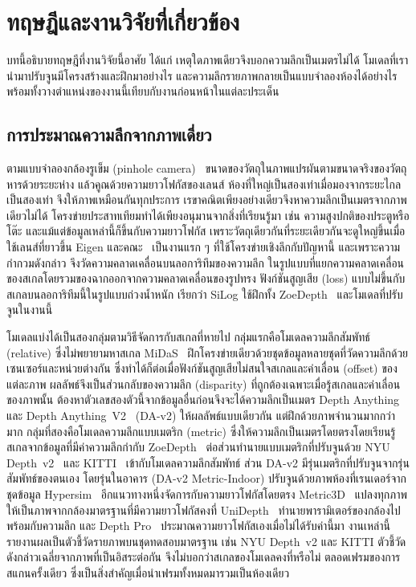 \section{ทฤษฎีและงานวิจัยที่เกี่ยวข้อง}\label{sec:related}

บทนี้อธิบายทฤษฎีที่งานวิจัยนี้อาศัย ได้แก่ เหตุใดภาพเดียวจึงบอกความลึกเป็นเมตรไม่ได้
โมเดลที่เรานำมาปรับจูนมีโครงสร้างและฝึกมาอย่างไร และความลึกรายภาพกลายเป็นแบบจำลองห้องได้อย่างไร
พร้อมทั้งวางตำแหน่งของงานนี้เทียบกับงานก่อนหน้าในแต่ละประเด็น

\subsection{การประมาณความลึกจากภาพเดี่ยว}
ตามแบบจำลองกล้องรูเข็ม (pinhole camera)~\cite{hartley} ขนาดของวัตถุในภาพแปรผันตามขนาดจริงของวัตถุ
หารด้วยระยะห่าง แล้วคูณด้วยความยาวโฟกัสของเลนส์ ห้องที่ใหญ่เป็นสองเท่าเมื่อมองจากระยะไกลเป็นสองเท่า
จึงให้ภาพเหมือนกันทุกประการ เรขาคณิตเพียงอย่างเดียวจึงหาความลึกเป็นเมตรจากภาพเดียวไม่ได้
โครงข่ายประสาทเทียมทำได้เพียงอนุมานจากสิ่งที่เรียนรู้มา เช่น ความสูงปกติของประตูหรือโต๊ะ
และแม้แต่ข้อมูลเหล่านี้ก็ขึ้นกับความยาวโฟกัส เพราะวัตถุเดียวกันที่ระยะเดียวกันจะดูใหญ่ขึ้นเมื่อใช้เลนส์ที่ยาวขึ้น
Eigen และคณะ~\cite{eigen14} เป็นงานแรก ๆ ที่ใช้โครงข่ายเชิงลึกกับปัญหานี้
และเพราะความกำกวมดังกล่าว จึงวัดความคลาดเคลื่อนบนลอการิทึมของความลึก
ในรูปแบบที่แยกความคลาดเคลื่อนของสเกลโดยรวมของฉากออกจากความคลาดเคลื่อนของรูปทรง
ฟังก์ชันสูญเสีย (loss) แบบไม่ขึ้นกับสเกลบนลอการิทึมนี้ในรูปแบบถ่วงน้ำหนัก เรียกว่า SiLog
ใช้ฝึกทั้ง ZoeDepth~\cite{zoedepth} และโมเดลที่ปรับจูนในงานนี้

โมเดลแบ่งได้เป็นสองกลุ่มตามวิธีจัดการกับสเกลที่หายไป กลุ่มแรกคือโมเดลความลึกสัมพัทธ์ (relative) ซึ่งไม่พยายามหาสเกล
MiDaS~\cite{midas} ฝึกโครงข่ายเดียวด้วยชุดข้อมูลหลายชุดที่วัดความลึกด้วยเซนเซอร์และหน่วยต่างกัน
ซึ่งทำได้ก็ต่อเมื่อฟังก์ชันสูญเสียไม่สนใจสเกลและค่าเลื่อน (offset) ของแต่ละภาพ
ผลลัพธ์จึงเป็นส่วนกลับของความลึก (disparity) ที่ถูกต้องเฉพาะเมื่อรู้สเกลและค่าเลื่อนของภาพนั้น
ต้องหาตัวเลขสองตัวนี้จากข้อมูลอื่นก่อนจึงจะได้ความลึกเป็นเมตร Depth Anything~\cite{da1}
และ Depth Anything~V2~\cite{da2} (\mbox{DA-v2}) ให้ผลลัพธ์แบบเดียวกัน แต่ฝึกด้วยภาพจำนวนมากกว่ามาก
กลุ่มที่สองคือโมเดลความลึกแบบเมตริก (metric) ซึ่งให้ความลึกเป็นเมตรโดยตรงโดยเรียนรู้สเกลจากข้อมูลที่มีค่าความลึกกำกับ
ZoeDepth~\cite{zoedepth} ต่อส่วนทำนายแบบเมตริกที่ปรับจูนด้วย NYU Depth~v2~\cite{nyuv2} และ KITTI~\cite{kitti}
เข้ากับโมเดลความลึกสัมพัทธ์ ส่วน \mbox{DA-v2} มีรุ่นเมตริกที่ปรับจูนจากรุ่นสัมพัทธ์ของตนเอง
โดยรุ่นในอาคาร (\mbox{DA-v2} Metric-Indoor) ปรับจูนด้วยภาพห้องที่เรนเดอร์จากชุดข้อมูล Hypersim~\cite{hypersim}
อีกแนวทางหนึ่งจัดการกับความยาวโฟกัสโดยตรง Metric3D~\cite{metric3d} แปลงทุกภาพให้เป็นภาพจากกล้องมาตรฐานที่มีความยาวโฟกัสคงที่
UniDepth~\cite{unidepth} ทำนายพารามิเตอร์ของกล้องไปพร้อมกับความลึก และ Depth Pro~\cite{depthpro}
ประมาณความยาวโฟกัสเองเมื่อไม่ได้รับค่านี้มา งานเหล่านี้รายงานผลเป็นตัวชี้วัดรายภาพบนชุดทดสอบมาตรฐาน
เช่น NYU Depth~v2 และ KITTI ตัวชี้วัดดังกล่าวเฉลี่ยจากภาพที่เป็นอิสระต่อกัน จึงไม่บอกว่าสเกลของโมเดลคงที่หรือไม่
ตลอดเฟรมของการสแกนครั้งเดียว ซึ่งเป็นสิ่งสำคัญเมื่อนำเฟรมทั้งหมดมารวมเป็นห้องเดียว

